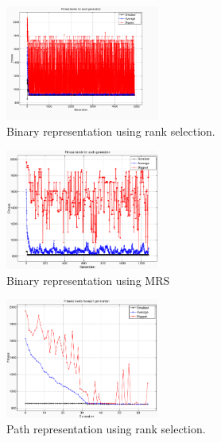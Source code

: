 \documentclass[10pt,a4paper,openbib]{article}
\begin{document}
\begin{multicols}{2}
\begin{figure}[H]
\begin{center}
        \includegraphics[width=0.45\textwidth]{images/result2/GraphBinaryfalse6.png}
        \caption{Binary representation using rank selection.}
        \label{fig:cities15GraphBinaryfalse}
\end{center}
\end{figure}

\begin{figure}[H]
\begin{center}
        \includegraphics[width=0.45\textwidth]{images/result2/GraphBinarytrue0.png}
        \caption{Binary representation using MRS}
        \label{fig:cities15GraphBinarytrue}
\end{center}
\end{figure}


\begin{figure}[H]
\begin{center}
        \includegraphics[width=0.45\textwidth]{images/result2/GraphPathfalse2.png}
        \caption{Path representation using rank selection.}
        \label{fig:cities15GraphPathfalse}    
\end{center}
\end{figure}


\end{multicols}
\end{document}
